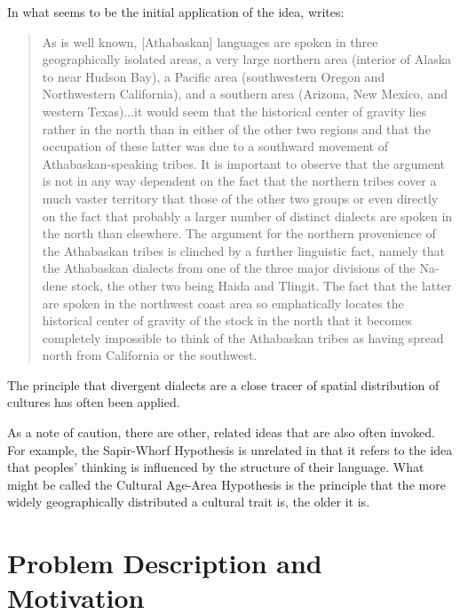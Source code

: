 \documentclass[11pt]{article}
\begin{document}
In what seems to be the initial application of the idea, \cite{sapir16} writes:

\begin{quote}
 As is well known, [Athabaskan] languages are spoken in three geographically isolated areas, a very large northern area (interior of Alaska to near Hudson Bay), a Pacific area (southwestern Oregon and Northwestern California), and a southern area (Arizona, New Mexico, and western Texas)...it would seem that the historical center of gravity lies rather in the north than in either of the other two regions and that the occupation of these latter was due to a southward movement of Athabaskan-speaking tribes. It is important to observe that the argument is not in any way dependent on the fact that the northern tribes cover a much vaster territory that those of the other two groups or even directly on the fact that probably a larger number of distinct dialects are spoken in the north than elsewhere. The argument for the northern provenience of the Athabaskan tribes is clinched by a further linguistic fact, namely that the Athabaskan dialects from one of the three major divisions of the Na-dene stock, the other two being Haida and Tlingit. The fact that the latter are spoken in the northwest coast area so emphatically locates the historical center of gravity of the stock in the north that it becomes completely impossible to think of the Athabaskan tribes as having spread north from California or the southwest. 
\end{quote}



The principle that divergent dialects are a close tracer of spatial distribution of cultures has often been applied. 

As a note of caution, there are other, related ideas that are also often invoked. For example, the Sapir-Whorf Hypothesis is unrelated in that it refers to the idea that peoples' thinking is influenced by the structure of their language. What might be called the Cultural Age-Area Hypothesis is the principle that the more widely geographically distributed a cultural trait is, the older it is. 


\section{Problem Description and Motivation}
\end{document}
